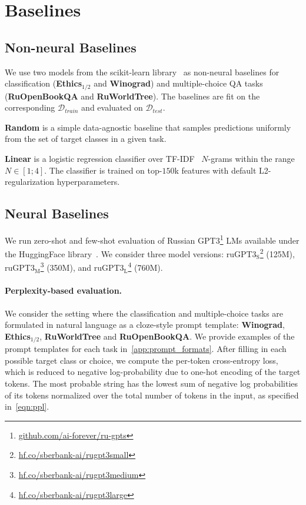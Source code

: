 \documentclass[11pt]{article}
\begin{document}
\section{Baselines}
\subsection{Non-neural Baselines}
We use two models from the scikit-learn library~\cite{pedregosa2011scikit} as non-neural baselines for classification (\textbf{Ethics$_{1/2}$} and \textbf{Winograd}) and multiple-choice QA tasks (\textbf{RuOpenBookQA} and \textbf{RuWorldTree}). The baselines are fit on the corresponding $\mathcal{D}_{train}$ and evaluated on $\mathcal{D}_{test}$.

\vspace{0.5mm}
\noindent \textbf{Random} is a simple data-agnostic baseline that samples predictions uniformly from the set of target classes in a given task.

\noindent \textbf{Linear} is a logistic regression classifier over TF-IDF~\cite{Salton1973OnTS} $N$-grams within the range $N \in [1; 4]$. The classifier is trained on top-$150$k features with default L2-regularization hyperparameters. 


\subsection{Neural Baselines}
We run zero-shot and few-shot evaluation of Russian GPT3\footnote{\href{https://github.com/ai-forever/ru-gpts}{github.com/ai-forever/ru-gpts}} LMs available under the HuggingFace library~\cite{wolf-etal-2020-transformers}. We consider three model versions: ruGPT3$_\text{S}$\footnote{\href{https://huggingface.co/sberbank-ai/rugpt3small_based_on_gpt2}{hf.co/sberbank-ai/rugpt3small}} (125M), ruGPT3$_\text{M}$\footnote{\href{https://huggingface.co/sberbank-ai/rugpt3medium_based_on_gpt2}{hf.co/sberbank-ai/rugpt3medium}} (350M), and ruGPT3$_\text{L}$\footnote{\href{https://huggingface.co/sberbank-ai/rugpt3large_based_on_gpt2}{hf.co/sberbank-ai/rugpt3large}} (760M).

\paragraph{Perplexity-based evaluation.} We consider the setting where the classification and multiple-choice tasks are formulated in natural language as a cloze-style prompt template: \textbf{Winograd}, \textbf{Ethics$_{1/2}$}, \textbf{RuWorldTree} and \textbf{RuOpenBookQA}. We provide examples of the prompt templates for each task in~\autoref{app:prompt_formats}. After filling in each possible target class or choice, we compute the per-token cross-entropy loss, which is reduced to negative log-probability due to one-hot encoding of the target tokens. The most probable string has the lowest sum of negative log probabilities of its tokens normalized over the total number of tokens in the input, as specified in~\autoref{eqn:ppl}.
\end{document}
